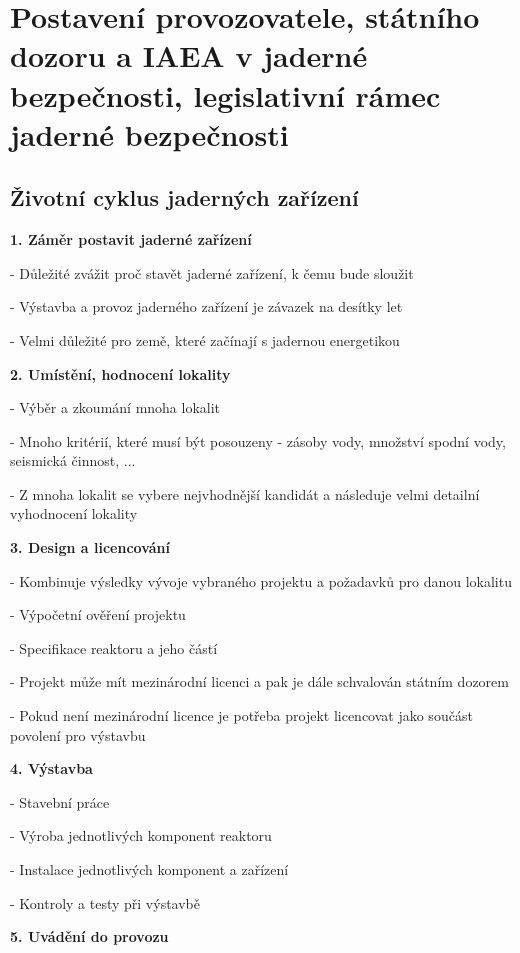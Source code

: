 \newpage
\section{Postavení provozovatele, státního dozoru a IAEA v jaderné bezpečnosti, legislativní rámec jaderné bezpečnosti}

\subsection{Životní cyklus jaderných zařízení}

\textbf{1. Záměr postavit jaderné zařízení}

\noindent - 	Důležité zvážit proč stavět jaderné zařízení, k čemu bude sloužit

\noindent - 	Výstavba a provoz jaderného zařízení je závazek na desítky let

\noindent - 	Velmi důležité pro země, které začínají s jadernou energetikou

\noindent\textbf{2. Umístění, hodnocení lokality}

\noindent - 	Výběr a zkoumání mnoha lokalit

\noindent - 	Mnoho kritérií, které musí být posouzeny - zásoby vody, množství spodní vody, seismická činnost, ...

\noindent - 	Z mnoha lokalit se vybere nejvhodnější kandidát a následuje velmi detailní vyhodnocení lokality

\noindent\textbf{3. Design a licencování}

\noindent - 	Kombinuje výsledky vývoje vybraného projektu a požadavků pro danou lokalitu

\noindent - 	Výpočetní ověření projektu

\noindent - 	Specifikace reaktoru a jeho částí

\noindent - 	Projekt může mít mezinárodní licenci a pak je dále schvalován státním dozorem

\noindent - 	Pokud není mezinárodní licence je potřeba projekt licencovat jako součást povolení pro výstavbu

\noindent\textbf{4. Výstavba}

\noindent - 	Stavební práce

\noindent - 	Výroba jednotlivých komponent reaktoru

\noindent - 	Instalace jednotlivých komponent a zařízení

\noindent - 	Kontroly a testy při výstavbě

\noindent\textbf{5. Uvádění do provozu}

